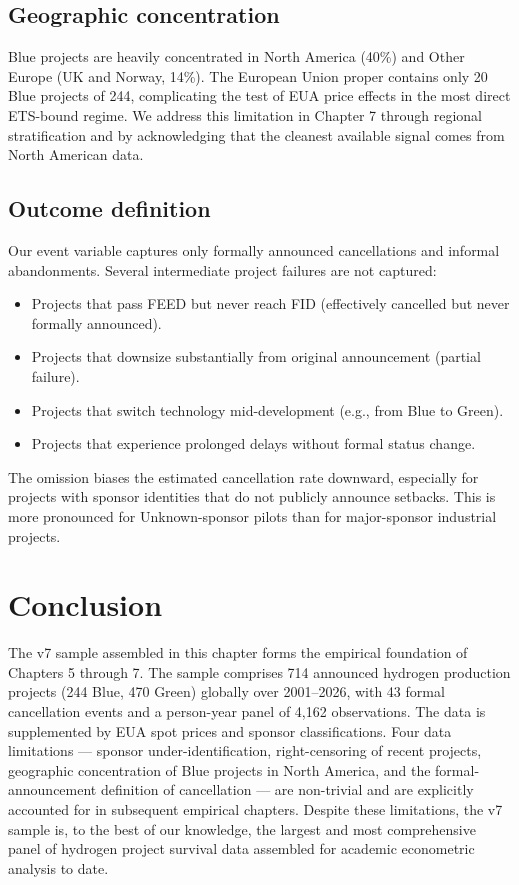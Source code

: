\subsection{Geographic concentration}

Blue projects are heavily concentrated in North America (40\%) and Other Europe (UK and Norway, 14\%). The European Union proper contains only 20 Blue projects of 244, complicating the test of EUA price effects in the most direct ETS-bound regime. We address this limitation in Chapter 7 through regional stratification and by acknowledging that the cleanest available signal comes from North American data.

\subsection{Outcome definition}

Our event variable captures only formally announced cancellations and informal abandonments. Several intermediate project failures are not captured:
\begin{itemize}
    \item Projects that pass FEED but never reach FID (effectively cancelled but never formally announced).
    \item Projects that downsize substantially from original announcement (partial failure).
    \item Projects that switch technology mid-development (e.g., from Blue to Green).
    \item Projects that experience prolonged delays without formal status change.
\end{itemize}
The omission biases the estimated cancellation rate downward, especially for projects with sponsor identities that do not publicly announce setbacks. This is more pronounced for Unknown-sponsor pilots than for major-sponsor industrial projects.

\section{Conclusion}
\label{sec:ch4-conclusion}

The v7 sample assembled in this chapter forms the empirical foundation of Chapters 5 through 7. The sample comprises 714 announced hydrogen production projects (244 Blue, 470 Green) globally over 2001--2026, with 43 formal cancellation events and a person-year panel of 4{,}162 observations. The data is supplemented by EUA spot prices and sponsor classifications. Four data limitations --- sponsor under-identification, right-censoring of recent projects, geographic concentration of Blue projects in North America, and the formal-announcement definition of cancellation --- are non-trivial and are explicitly accounted for in subsequent empirical chapters. Despite these limitations, the v7 sample is, to the best of our knowledge, the largest and most comprehensive panel of hydrogen project survival data assembled for academic econometric analysis to date.


